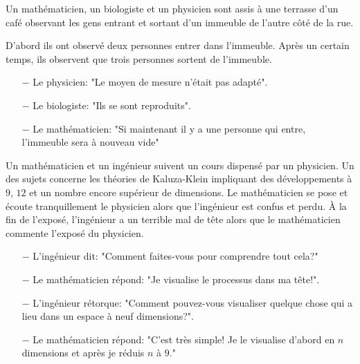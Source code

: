 Un mathématicien, un biologiste et un physicien sont assis à une terrasse d'un café observant les gens entrant et sortant d'un immeuble de l'autre côté de la rue.

D'abord ils ont observé deux personnes entrer dans l'immeuble. Après un certain temps, ils observent que trois personnes sortent de l'immeuble.

\begin{itemize}	 
	\item[$-$]  Le physicien: "Le moyen de mesure n'était pas adapté".

	\item[$-$] Le biologiste: "Ils se sont reproduits".

	\item[$-$] Le mathématicien: "Si maintenant il y a une personne qui entre, l'immeuble sera à nouveau vide"
\end{itemize}

	\begin{center}\underline{\hspace{5 cm}}\end{center}

Un mathématicien et un ingénieur suivent un cours dispensé par un physicien. Un des sujets concerne les théories de Kaluza-Klein impliquant des développements à $9$, $12$ et un nombre encore supérieur de dimensions. Le mathématicien se pose et écoute tranquillement le physicien alors que l'ingénieur est confus et perdu. À la fin de l'exposé, l'ingénieur a un terrible mal de tête alors que le mathématicien commente l'exposé du physicien.

\begin{itemize}	 
	\item[$-$] L'ingénieur dit: "Comment faites-vous pour comprendre tout cela?"

	\item[$-$] Le mathématicien répond: "Je visualise le processus dans ma tête!".

	\item[$-$] L'ingénieur rétorque: "Comment pouvez-vous visualiser quelque chose qui a lieu dans un espace à neuf dimensions?".

	\item[$-$] Le mathématicien répond: "C'est très simple! Je le visualise d'abord en $n$ dimensions et après je réduis $n$ à $9$."
\end{itemize}

	\begin{center}\underline{\hspace{5 cm}}\end{center}

